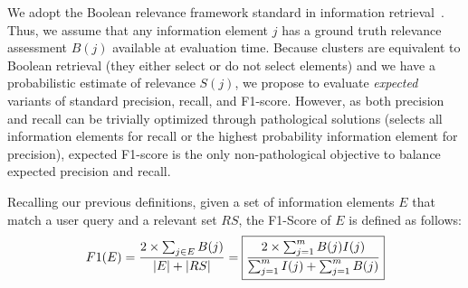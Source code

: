 We adopt the Boolean relevance framework standard in information retrieval~\cite{Baeza-Yates2010}. Thus, we assume that any information element $j$ has a ground truth relevance assessment $B(j)$ available at evaluation time.  
Because clusters are equivalent to Boolean retrieval (they either select or do not select elements) and we have a probabilistic estimate of relevance $S(j)$, we propose to evaluate
\emph{expected} variants of standard precision, recall, and F1-score.
However, as both precision and recall can be trivially optimized through pathological solutions (selects all information elements for recall or the highest probability information element for precision), expected F1-score is the only non-pathological objective to balance expected precision and recall. %

Recalling our previous definitions, given a set of information elements  $E$  that match a user query and a relevant set $RS$, %
the F1-Score of $E$ is defined as follows:
\begin{equation}
   F1(E)=\dfrac{2\times\sum_{j\in E}B(j)}{|E|+|RS|}= \fbox{$ \dfrac{2\times\sum_{j=1}^{m}B(j)I(j)}{\sum_{j=1}^{m}I(j)+\sum_{j=1}^{m}B(j)}$}
\end{equation}

